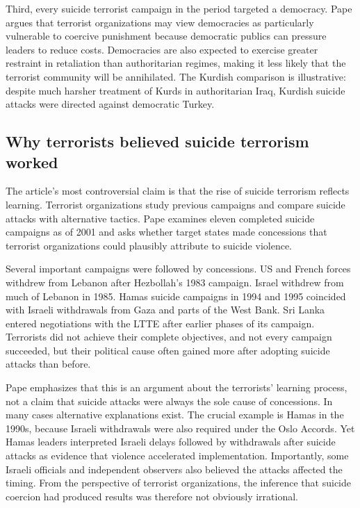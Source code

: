 Third, every suicide terrorist campaign in the period targeted a democracy. Pape argues that terrorist organizations may view democracies as particularly vulnerable to coercive punishment because democratic publics can pressure leaders to reduce costs. Democracies are also expected to exercise greater restraint in retaliation than authoritarian regimes, making it less likely that the terrorist community will be annihilated. The Kurdish comparison is illustrative: despite much harsher treatment of Kurds in authoritarian Iraq, Kurdish suicide attacks were directed against democratic Turkey.

\subsection{Why terrorists believed suicide terrorism worked}

The article's most controversial claim is that the rise of suicide terrorism reflects learning. Terrorist organizations study previous campaigns and compare suicide attacks with alternative tactics. Pape examines eleven completed suicide campaigns as of 2001 and asks whether target states made concessions that terrorist organizations could plausibly attribute to suicide violence.

Several important campaigns were followed by concessions. US and French forces withdrew from Lebanon after Hezbollah's 1983 campaign. Israel withdrew from much of Lebanon in 1985. Hamas suicide campaigns in 1994 and 1995 coincided with Israeli withdrawals from Gaza and parts of the West Bank. Sri Lanka entered negotiations with the LTTE after earlier phases of its campaign. Terrorists did not achieve their complete objectives, and not every campaign succeeded, but their political cause often gained more after adopting suicide attacks than before.

Pape emphasizes that this is an argument about the terrorists' learning process, not a claim that suicide attacks were always the sole cause of concessions. In many cases alternative explanations exist. The crucial example is Hamas in the 1990s, because Israeli withdrawals were also required under the Oslo Accords. Yet Hamas leaders interpreted Israeli delays followed by withdrawals after suicide attacks as evidence that violence accelerated implementation. Importantly, some Israeli officials and independent observers also believed the attacks affected the timing. From the perspective of terrorist organizations, the inference that suicide coercion had produced results was therefore not obviously irrational.

